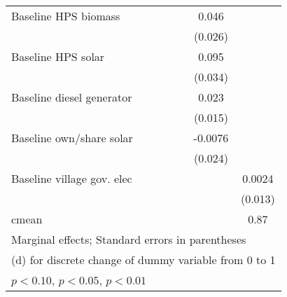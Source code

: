 \begin{table}[htbp]
\begin{tabular*}{1\hsize}{@{\hskip\tabcolsep\extracolsep\fill}l*{6}{c}}
Baseline HPS biomass&                  &                  &                  &                  &    0.046\sym{*}  &                  \\
                &                  &                  &                  &                  &  (0.026)         &                  \\
Baseline HPS solar&                  &                  &                  &                  &    0.095\sym{***}&                  \\
                &                  &                  &                  &                  &  (0.034)         &                  \\
Baseline diesel generator&                  &                  &                  &                  &    0.023         &                  \\
                &                  &                  &                  &                  &  (0.015)         &                  \\
Baseline own/share solar&                  &                  &                  &                  &  -0.0076         &                  \\
                &                  &                  &                  &                  &  (0.024)         &                  \\
Baseline village gov. elec&                  &                  &                  &                  &                  &   0.0024         \\
                &                  &                  &                  &                  &                  &  (0.013)         \\
\midrule
cmean           &                  &                  &                  &                  &                  &     0.87         \\
\bottomrule
\multicolumn{7}{l}{\footnotesize Marginal effects; Standard errors in parentheses}\\
\multicolumn{7}{l}{\footnotesize  (d) for discrete change of dummy variable from 0 to 1}\\
\multicolumn{7}{l}{\footnotesize \sym{*} \(p<0.10\), \sym{**} \(p<0.05\), \sym{***} \(p<0.01\)}\\
\end{tabular*}
\end{table}
